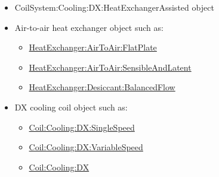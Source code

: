\begin{itemize}
\item
  CoilSystem:Cooling:DX:HeatExchangerAssisted object
\item
  Air-to-air heat exchanger object such as:
\begin{itemize}
\item
\hyperref[heatexchangerairtoairflatplate]{HeatExchanger:AirToAir:FlatPlate}
\item
\hyperref[heatexchangerairtoairsensibleandlatent]{HeatExchanger:AirToAir:SensibleAndLatent}
\item
\hyperref[heatexchangerdesiccantbalancedflow]{HeatExchanger:Desiccant:BalancedFlow}
\end{itemize}
\item
  DX cooling coil object such as:
\begin{itemize}
\item
\hyperref[coilcoolingdxsinglespeed]{Coil:Cooling:DX:SingleSpeed}
\item
\hyperref[coilcoolingdxvariablespeed]{Coil:Cooling:DX:VariableSpeed}
\item
\hyperref[coilcoolingdx]{Coil:Cooling:DX}
\end{itemize}
\end{itemize}

